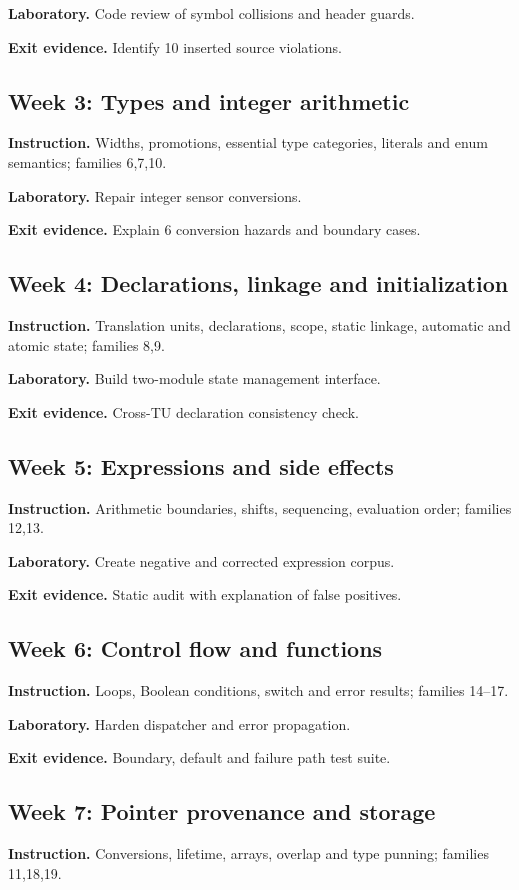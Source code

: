 \documentclass[10pt,letterpaper]{article}
\begin{document}
\textbf{Laboratory.} Code review of symbol collisions and header guards.

\textbf{Exit evidence.} Identify 10 inserted source violations.

\subsection{Week 3: Types and integer arithmetic}
\textbf{Instruction.} Widths, promotions, essential type categories, literals and enum semantics; families 6,7,10.

\textbf{Laboratory.} Repair integer sensor conversions.

\textbf{Exit evidence.} Explain 6 conversion hazards and boundary cases.

\subsection{Week 4: Declarations, linkage and initialization}
\textbf{Instruction.} Translation units, declarations, scope, static linkage, automatic and atomic state; families 8,9.

\textbf{Laboratory.} Build two-module state management interface.

\textbf{Exit evidence.} Cross-TU declaration consistency check.

\subsection{Week 5: Expressions and side effects}
\textbf{Instruction.} Arithmetic boundaries, shifts, sequencing, evaluation order; families 12,13.

\textbf{Laboratory.} Create negative and corrected expression corpus.

\textbf{Exit evidence.} Static audit with explanation of false positives.

\subsection{Week 6: Control flow and functions}
\textbf{Instruction.} Loops, Boolean conditions, switch and error results; families 14--17.

\textbf{Laboratory.} Harden dispatcher and error propagation.

\textbf{Exit evidence.} Boundary, default and failure path test suite.

\subsection{Week 7: Pointer provenance and storage}
\textbf{Instruction.} Conversions, lifetime, arrays, overlap and type punning; families 11,18,19.
\end{document}
